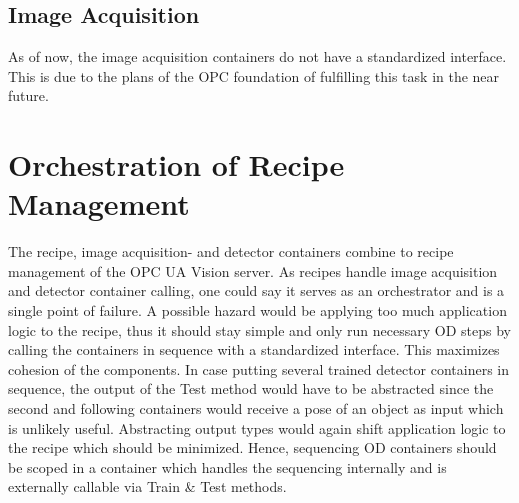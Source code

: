 \subsection{Image Acquisition}
As of now, the image acquisition containers do not have a standardized interface. This is due to the plans of the OPC foundation of fulfilling this task in the near future.

\section{Orchestration of Recipe Management}
The recipe, image acquisition- and  detector containers combine to recipe management of the OPC UA Vision server. As recipes handle image acquisition and detector container calling, one could say it serves as an orchestrator and is a single point of failure. A possible hazard would be applying too much application logic to the recipe, thus it should stay simple and only run necessary OD steps by calling the containers in sequence with a standardized interface. This maximizes cohesion of the components. In case putting several trained detector containers in sequence, the output of the Test method would have to be abstracted since the second and following containers would receive a pose of an object as input which is unlikely useful. Abstracting output types would again shift application logic to the recipe which should be minimized. Hence, sequencing OD containers should be scoped in a container which handles the sequencing internally and is externally callable via Train \& Test methods.